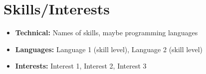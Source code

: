 \documentclass{article}
\newcommand{\awardname}[1]{
    \hspace{0em}
    {#1}
}
\begin{document}
    \section{Skills/Interests}
        \begin{itemize}
            \item {\bfseries Technical:} Names of skills, maybe programming languages
            \item {\bfseries Languages:} Language 1 (skill level), Language 2 (skill level)
            \item {\bfseries Interests:} Interest 1, Interest 2, Interest 3
        \end{itemize}
\end{document}
